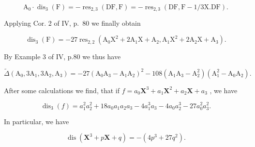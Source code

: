 \[
\mathrm{A} _ {0} \cdot \operatorname{dis} _ {3} (\mathrm{F}) = - \operatorname{res} _ {2, 3} (\mathrm{DF}, \mathrm{F}) = - \operatorname{res} _ {2, 3} (\mathrm{DF}, \mathrm{F} - 1 / 3 \mathrm{X}. \mathrm{DF}).
\]

Applying Cor. 2 of IV, p.~80 we finally obtain

\[
\operatorname{dis} _ {3} (\mathrm{F}) = - 2 7 \operatorname{res} _ {2, 2} \left(\mathrm{A} _ {0} \mathrm{X} ^ {2} + 2 \mathrm{A} _ {1} \mathrm{X} + \mathrm{A} _ {2}, \mathrm{A} _ {1} \mathrm{X} ^ {2} + 2 \mathrm{A} _ {2} \mathrm{X} + \mathrm{A} _ {3}\right).
\]

By Example 3 of IV, p.80 we thus have

\[
\tilde {\Delta} \left(\mathrm{A} _ {0}, 3 \mathrm{A} _ {1}, 3 \mathrm{A} _ {2}, \mathrm{A} _ {3}\right) = - 2 7 \left(\mathrm{A} _ {0} \mathrm{A} _ {3} - \mathrm{A} _ {1} \mathrm{A} _ {2}\right) ^ {2} - 1 0 8 \left(\mathrm{A} _ {1} \mathrm{A} _ {3} - \mathrm{A} _ {2} ^ {2}\right) \left(\mathrm{A} _ {1} ^ {2} - \mathrm{A} _ {0} \mathrm{A} _ {2}\right).
\]

After some calculations we find, that if \(f = a_0\mathbf{X}^3 + a_1\mathbf{X}^2 + a_2\mathbf{X} + a_3\) , we have

\[
\operatorname{dis} _ {3} (f) = a _ {1} ^ {2} a _ {2} ^ {2} + 1 8 a _ {0} a _ {1} a _ {2} a _ {3} - 4 a _ {1} ^ {3} a _ {3} - 4 a _ {0} a _ {2} ^ {3} - 2 7 a _ {0} ^ {2} a _ {3} ^ {2}.
\]

In particular, we have

\[
\operatorname{dis} \left(\mathbf {X} ^ {3} + p \mathbf {X} + q\right) = - \left(4 p ^ {3} + 2 7 q ^ {2}\right).
\]

